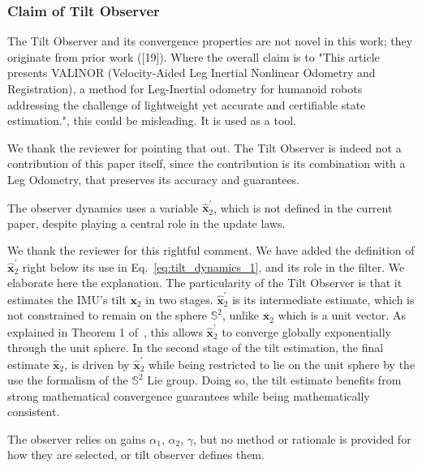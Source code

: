 
\subsubsection{Claim of Tilt Observer}

\begin{revquote}
The Tilt Observer and its convergence properties are not novel in this work; they originate from prior work ([19]). Where the overall claim is to "This article presents VALINOR (Velocity-Aided Leg Inertial Nonlinear Odometry and Registration), a method for Leg-Inertial odometry for humanoid robots addressing the challenge of lightweight yet accurate and certifiable state estimation.", this could be misleading. It is used as a tool.
\end{revquote}

We thank the reviewer for pointing that out. The Tilt Observer is indeed not a contribution of this paper itself, since the contribution is its combination with a Leg Odometry, that preserves its accuracy and guarantees.

\begin{revquote}
The observer dynamics uses a variable $\hat{\boldsymbol{x}}_{2}^{\prime} $, which is not defined in the current paper, despite playing a central role in the update laws.
\end{revquote}

We thank the reviewer for this rightful comment. We have added the definition of $\hat{\boldsymbol{x}}_{2}^{\prime} $ right below its use in Eq.~\eqref{eq:tilt_dynamics_1}, and its role in the filter. We elaborate here the explanation.
The particularity of the Tilt Observer is that it estimates the IMU's tilt $\boldsymbol{x}_{2}$ in two stages. $\hat{\boldsymbol{x}}_{2}^{\prime} $ is its intermediate estimate, which is not constrained to remain on the sphere $\mathbb{S}^{2}$, unlike $\boldsymbol{x}_{2}$ which is a unit vector. As explained in Theorem 1 of~\cite{benallegue2020LyapunovStableOrientationEstimatorHumanoids}, this allows $\hat{\boldsymbol{x}}_{2}^{\prime} $ to converge globally exponentially through the unit sphere. In the second stage of the tilt estimation, the final estimate $\hat{\boldsymbol{x}}_{2}$, is driven by $\hat{\boldsymbol{x}}_{2}^{\prime}$ while being restricted to lie on the unit sphere by the use the formalism of the $\mathbb{S}^{2}$ Lie group. Doing so, the tilt estimate benefits from strong mathematical convergence guarantees while being mathematically consistent.


\begin{revquote}
The observer relies on gains $\alpha_{1}$, $\alpha_{2}$, $\gamma$, but no method or rationale is provided for how they are selected, or tilt observer defines them.
\end{revquote}

